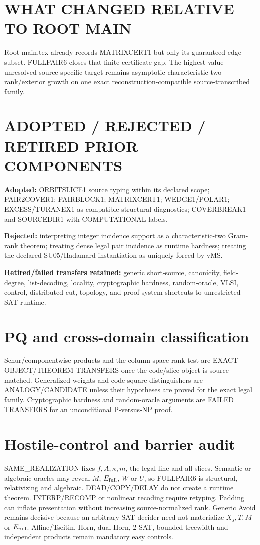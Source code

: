 \documentclass[11pt]{article}
\begin{document}
\section*{WHAT CHANGED RELATIVE TO ROOT MAIN}
Root main.tex already records MATRIXCERT1 but only its guaranteed edge subset. FULLPAIR6 closes that finite certificate gap. The highest-value unresolved source-specific target remains asymptotic characteristic-two rank/exterior growth on one exact reconstruction-compatible source-transcribed family.

\section*{ADOPTED / REJECTED / RETIRED PRIOR COMPONENTS}
\textbf{Adopted:} ORBITSLICE1 source typing within its declared scope; PAIR2COVER1; PAIRBLOCK1; MATRIXCERT1; WEDGE1/POLAR1; EXCESS/TURANEX1 as compatible structural diagnostics; COVERBREAK1 and SOURCEDIR1 with COMPUTATIONAL labels.

\textbf{Rejected:} interpreting integer incidence support as a characteristic-two Gram-rank theorem; treating dense legal pair incidence as runtime hardness; treating the declared SU05/Hadamard instantiation as uniquely forced by vMS.

\textbf{Retired/failed transfers retained:} generic short-source, canonicity, field-degree, list-decoding, locality, cryptographic hardness, random-oracle, VLSI, control, distributed-cut, topology, and proof-system shortcuts to unrestricted SAT runtime.

\section*{PQ and cross-domain classification}
Schur/componentwise products and the column-space rank test are EXACT OBJECT/THEOREM TRANSFERS once the code/slice object is source matched. Generalized weights and code-square distinguishers are ANALOGY/CANDIDATE unless their hypotheses are proved for the exact legal family. Cryptographic hardness and random-oracle arguments are FAILED TRANSFERS for an unconditional P-versus-NP proof.

\section*{Hostile-control and barrier audit}
SAME\_REALIZATION fixes \(f,A,\kappa,m\), the legal line and all slices. Semantic or algebraic oracles may reveal \(M\), \(E_{\rm full}\), \(W\) or \(U\), so FULLPAIR6 is structural, relativizing and algebraic. DEAD/COPY/DELAY do not create a runtime theorem. INTERP/RECOMP or nonlinear recoding require retyping. Padding can inflate presentation without increasing source-normalized rank. Generic Avoid remains decisive because an arbitrary SAT decider need not materialize \(X_s,T,M\) or \(E_{\rm full}\). Affine/Tseitin, Horn, dual-Horn, 2-SAT, bounded treewidth and independent products remain mandatory easy controls.
\end{document}
